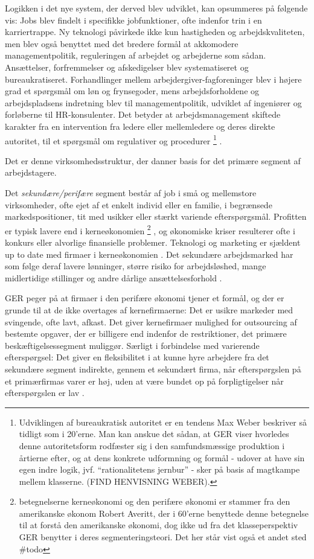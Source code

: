 Logikken i det nye system, der derved blev udviklet, kan opsummeres på følgende vis: Jobs blev findelt i specifikke jobfunktioner, ofte indenfor trin i en karriertrappe. Ny teknologi påvirkede ikke kun hastigheden og arbejdskvaliteten, men blev også benyttet med det bredere formål at akkomodere managementpolitik, reguleringen af arbejdet og arbejderne som sådan. Ansættelser, forfremmelser og afskedigelser blev systematiseret og bureaukratiseret. Forhandlinger mellem arbejdergiver-fagforeninger blev i højere grad et spørgsmål om løn og frynsegoder, mens arbejdsforholdene og arbejdspladsens indretning blev til managementpolitik, udviklet af ingeniører og forløberne til HR-konsulenter. Det betyder at arbejdsmanagement skiftede karakter fra en intervention fra ledere eller mellemledere og deres direkte autoritet, til et spørgsmål om regulativer og procedurer \parencite[189]{Gordon1982}%
%
\footnote{Udviklingen af bureaukratisk autoritet er en tendens Max Weber beskriver så tidligt som i 20'erne. Man kan anskue det sådan, at GER viser hvorledes denne autoritetsform rodfæster sig i den samfundsmæssige produktion i årtierne efter, og at dens konkrete udformning og formål - udover at have sin egen indre logik, jvf. “rationalitetens jernbur” - sker på basis af magtkampe mellem klasserne. (FIND HENVISNING WEBER).}%
%
. 


Det er denne virksomhedsstruktur, der danner basis for det primære segment af arbejdstagere.

Det \emph{sekundære/perifære} segment består af job i små og mellemstore virksomheder, ofte ejet af et enkelt individ eller en familie, i begrænsede markedspositioner, tit med usikker eller stærkt variende efterspørgsmål. Profitten er typisk lavere end i kerneøkonomien%
%
\footnote{betegnelserne kerneøkonomi og den perifære økonomi er stammer fra den amerikanske økonom Robert Averitt, der i 60'erne benyttede denne betegnelse til at forstå den amerikanske økonomi, dog ikke ud fra det klasseperspektiv GER benytter i deres segmenteringsteori. Det her står vist også et andet sted \#todo}%
%
, og økonomiske kriser resulterer ofte i konkurs eller alvorlige finansielle problemer. Teknologi og marketing er sjældent up to date med firmaer i kerneøkonomien \parencite[7]{Averitt1968}. Det sekundære arbejdsmarked har som følge deraf lavere lønninger, større risiko for arbejdsløshed, mange midlertidige  stillinger og andre dårlige ansættelsesforhold \parencite[70f]{Doeringer1971}.

GER peger på at firmaer i den perifære økonomi tjener et formål, og der er grunde til at de ikke overtages af kernefirmaerne: Det er usikre markeder med svingende, ofte lavt, afkast. Det giver kernefirmaer mulighed for outsourcing af bestemte opgaver, der er billigere end indenfor de restriktioner, det primære beskæftigelsessegment muliggør. Særligt i forbindelse med varierende efterspørgsel: Det giver en fleksibilitet i at kunne hyre arbejdere fra det sekundære segment indirekte, gennem et sekundært firma, når efterspørgslen på et primærfirmas varer er høj, uden at være bundet op på forpligtigelser når efterspørgslen er lav \parencite[191]{Gordon1982}. 

